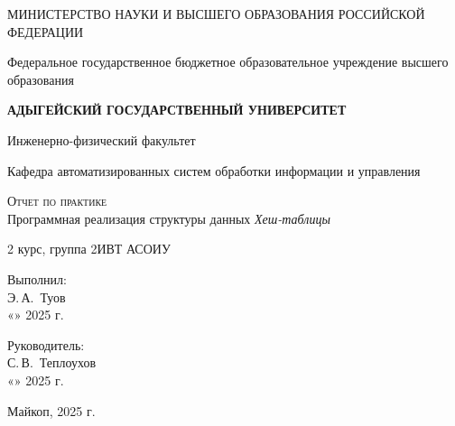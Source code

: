 \documentclass[12pt,a4paper]{scrartcl}
\begin{document}
	\begin{titlepage}
		\begin{center}
			\large
			МИНИСТЕРСТВО НАУКИ И ВЫСШЕГО ОБРАЗОВАНИЯ РОССИЙСКОЙ ФЕДЕРАЦИИ
			
			Федеральное государственное бюджетное образовательное учреждение высшего образования
			
			\textbf{АДЫГЕЙСКИЙ ГОСУДАРСТВЕННЫЙ УНИВЕРСИТЕТ}
			\vspace{0.25cm}
			
			Инженерно-физический факультет
			
			Кафедра автоматизированных систем обработки информации и управления
			\vfill
			
			\textsc{Отчет по практике}\\[5mm]
			
			{\LARGE Программная реализация структуры данных \textit{Хеш-таблицы}}
			\bigskip
			
			2 курс, группа 2ИВТ АСОИУ
		\end{center}
		\vfill
		
		\newlength{\ML}
		\hfill\begin{minipage}{0.5\textwidth}
			Выполнил:\\
			\underline{\hspace{\ML}} Э.\,А.~Туов\\
			«\underline{\hspace{0.7cm}}» \underline{\hspace{2cm}} 2025 г.
		\end{minipage}%
		\bigskip
		
		\hfill\begin{minipage}{0.5\textwidth}
			Руководитель:\\
			\underline{\hspace{\ML}} С.\,В.~Теплоухов\\
			«\underline{\hspace{0.7cm}}» \underline{\hspace{2cm}} 2025 г.
		\end{minipage}%
		\vfill
		
		\begin{center}
			Майкоп, 2025 г.
		\end{center}
	\end{titlepage}

    \newpage
\end{document}
